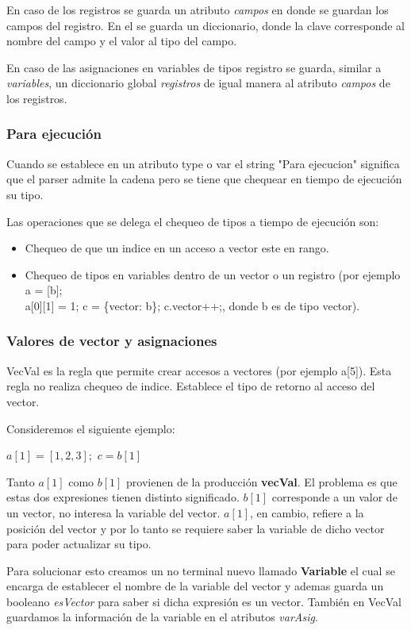 En caso de los registros se guarda un atributo \textit{campos} en donde se guardan los campos del registro. En el se guarda un diccionario, donde la clave corresponde al nombre del campo y el valor al tipo del campo.

En caso de las asignaciones en variables de tipos registro se guarda, similar a \textit{variables}, un diccionario global \textit{registros} de igual manera al atributo \textit{campos} de los registros.

\subsubsection{Para ejecución}
Cuando se establece en un atributo type o var el string "Para ejecucion" significa que el parser admite la cadena pero se tiene que chequear en tiempo de ejecución su tipo. 

Las operaciones que se delega el chequeo de tipos a tiempo de ejecución son:

\begin{itemize}
\item Chequeo de que un indice en un acceso a vector este en rango.
\item Chequeo de tipos en variables dentro de un vector o un registro (por ejemplo a = [b]; \\ a[0][1] = 1; c = \{vector: b\}; c.vector++;, donde b es de tipo vector).

\end{itemize}

\subsubsection{Valores de vector y asignaciones}
VecVal es la regla que permite crear accesos a vectores (por ejemplo a[5]). Esta regla no realiza chequeo de indice. Establece el tipo de retorno al acceso del vector.

Consideremos el siguiente ejemplo:

$ a[1] = [1,2,3];$
$ c = b[1] $

Tanto $ a[1]$ como $ b[1]$ provienen de la producción \textbf{vecVal}. El problema es que estas dos expresiones tienen distinto significado. $ b[1]$ corresponde a un valor de un vector, no interesa la variable del vector. $ a[1]$, en cambio, refiere a la posición del vector y por lo tanto se requiere saber la variable de dicho vector para poder actualizar su tipo.

Para solucionar esto creamos un no terminal nuevo llamado \textbf{Variable} el cual se encarga de establecer el nombre de la variable del vector y ademas guarda un booleano \textit{esVector} para saber si dicha expresión es un vector. También en VecVal guardamos la información de la variable en el atributos \textit{varAsig}.

